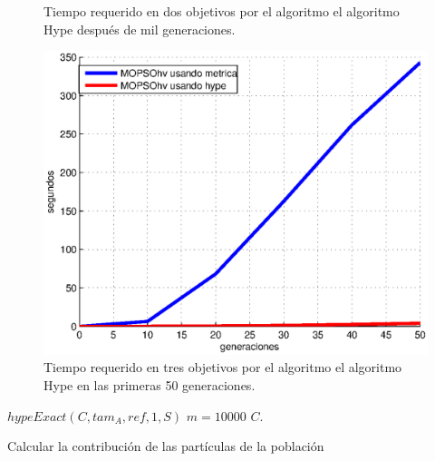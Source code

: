 \begin{enumerate}
\begin{itemize}
\begin{figure}
\begin{minipage}{0.4\textwidth}
    \DIFaddendFL \caption[Tiempo entre MOPSOhv en dos dimensiones (b)]{Tiempo requerido en dos objetivos por el algoritmo \DIFdelbeginFL {}\DIFdelendFL \DIFaddbeginFL {}\DIFaddendFL el \DIFdelbeginFL {}\DIFdelendFL algoritmo Hype despu\'es de mil generaciones.}
    \label{fig:time2}
  \end{minipage}
  \begin{minipage}{0.4\textwidth}
    \centering
    \includegraphics[scale=0.5]{Cap3/time3.eps}
    \caption[Tiempo entre MOPSOhv en tres dimensiones]{Tiempo requerido en tres objetivos por el algoritmo \DIFdelbeginFL {}\DIFdelendFL \DIFaddbeginFL {}\DIFaddendFL el \DIFdelbeginFL {}\DIFdelendFL algoritmo Hype en las primeras 50 generaciones.}
    \label{fig:time3}
  \end{minipage}%
\end{figure}

      
     \begin{algorithm}
    \begin{algorithmic}[1]
	\STATE $hypeExact(C, tam_A, ref, 1, S)$
	\ELSE
	\STATE $m = 10000$        
	\STATE \DIFdelbegin {}%
\DIFdelend \DIFaddbegin {}\DIFaddend \ENDIF
	\RETURN $C$.
	\end{algorithmic}
	\caption{Calcular la contribuci\'on de las part\'iculas de la poblaci\'on}
	\label{alg:contMOPSOhv}
	\end{algorithm}


\end{itemize}
\end{enumerate}
